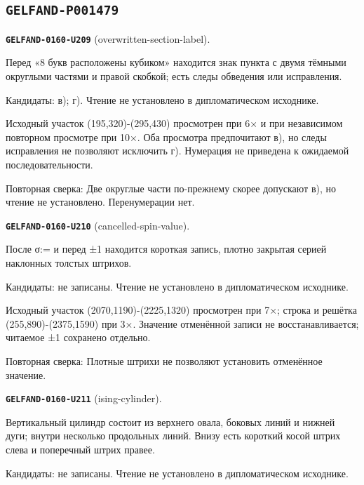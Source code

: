 \subsection*{\texttt{GELFAND-P001479}}
\par\noindent\leavevmode{}\label{GELFAND-0160-U209}\label{GELFAND-P001479:overwritten-section-label}\textbf{\texttt{GELFAND-0160-U209}} (overwritten-section-label).\nopagebreak[4]\par
Перед «8 букв расположены кубиком» находится знак пункта с двумя тёмными округлыми частями и правой скобкой; есть следы обведения или исправления.\par
Кандидаты: в); г). Чтение не установлено в дипломатическом исходнике.\par
Исходный участок (195,320)-(295,430) просмотрен при 6× и при независимом повторном просмотре при 10×. Оба просмотра предпочитают в), но следы исправления не позволяют исключить г). Нумерация не приведена к ожидаемой последовательности.\par
Повторная сверка: Две округлые части по-прежнему скорее допускают в), но чтение не установлено. Перенумерации нет.\par\medskip
\par\noindent\leavevmode{}\label{GELFAND-0160-U210}\label{GELFAND-P001479:cancelled-spin-value}\textbf{\texttt{GELFAND-0160-U210}} (cancelled-spin-value).\nopagebreak[4]\par
После σ:= и перед ±1 находится короткая запись, плотно закрытая серией наклонных толстых штрихов.\par
Кандидаты: не записаны. Чтение не установлено в дипломатическом исходнике.\par
Исходный участок (2070,1190)-(2225,1320) просмотрен при 7×; строка и решётка (255,890)-(2375,1590) при 3×. Значение отменённой записи не восстанавливается; читаемое ±1 сохранено отдельно.\par
Повторная сверка: Плотные штрихи не позволяют установить отменённое значение.\par\medskip
\par\noindent\leavevmode{}\label{GELFAND-0160-U211}\label{GELFAND-P001479:ising-cylinder}\textbf{\texttt{GELFAND-0160-U211}} (ising-cylinder).\nopagebreak[4]\par
Вертикальный цилиндр состоит из верхнего овала, боковых линий и нижней дуги; внутри несколько продольных линий. Внизу есть короткий косой штрих слева и поперечный штрих правее.\par
Кандидаты: не записаны. Чтение не установлено в дипломатическом исходнике.\par
